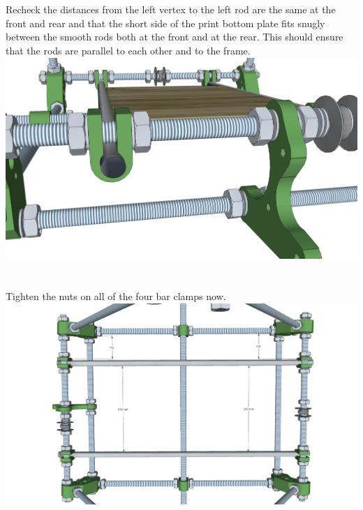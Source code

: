 \documentclass[twoside,openany,a4paper,titlepage]{memoir}
\begin{document}
	\section{}
	Recheck the distances from the left vertex to the left rod are the same at the front and rear and that the
	short side of the print bottom plate fits snugly between the smooth rods both at the front and at the rear.
	This should ensure that the rods are parallel to each other and to the frame.\\
	\includegraphics[width=1\linewidth]{graphics/ch6_9.png}
	
	\section{}
	Tighten the nuts on all of the four bar clamps now.\\
	\includegraphics[width=1\linewidth]{graphics/ch6_10.png}
	
\end{document}
